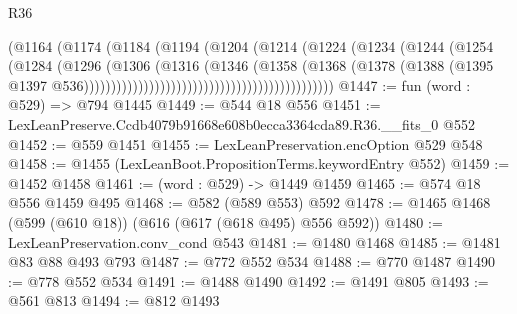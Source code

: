\begin{lexlean}{R36}
\begin{coremodule}
                                                        (@1164
                                                          (@1174
                                                            (@1184
                                                              (@1194
                                                                (@1204
                                                                  (@1214
                                                                    (@1224
                                                                      (@1234
                                                                        (@1244
                                                                          (@1254
                                                                            (@1284
                                                                              (@1296
                                                                                (@1306
                                                                                  (@1316
                                                                                    (@1346
                                                                                      (@1358
                                                                                        (@1368
                                                                                          (@1378
                                                                                            (@1388
                                                                                              (@1395
                                                                                                @1397
                                                                                                @536))))))))))))))))))))))))))))))))))))))))))))))
@1447 := fun (word : @529) => @794 @1445
@1449 := @544 @18 @556
@1451 := LexLeanPreserve.Ccdb4079b91668e608b0ecca3364cda89.R36.__fits_0 @552
@1452 := @559 @1451
@1455 := LexLeanPreservation.encOption @529 @548
@1458 := @1455 (LexLeanBoot.PropositionTerms.keywordEntry @552)
@1459 := @1452 @1458
@1461 := (word : @529) -> @1449 @1459
@1465 := @574 @18 @556 @1459 @495
@1468 := @582 (@589 @553) @592
@1478 := @1465 @1468 (@599 (@610 @18)) (@616 (@617 (@618 @495) @556 @592))
@1480 := LexLeanPreservation.conv_cond @543
@1481 := @1480 @1468
@1485 := @1481 @83 @88 @493 @793
@1487 := @772 @552 @534
@1488 := @770 @1487
@1490 := @778 @552 @534
@1491 := @1488 @1490
@1492 := @1491 @805
@1493 := @561 @813
@1494 := @812 @1493

\end{coremodule}
\end{lexlean}
